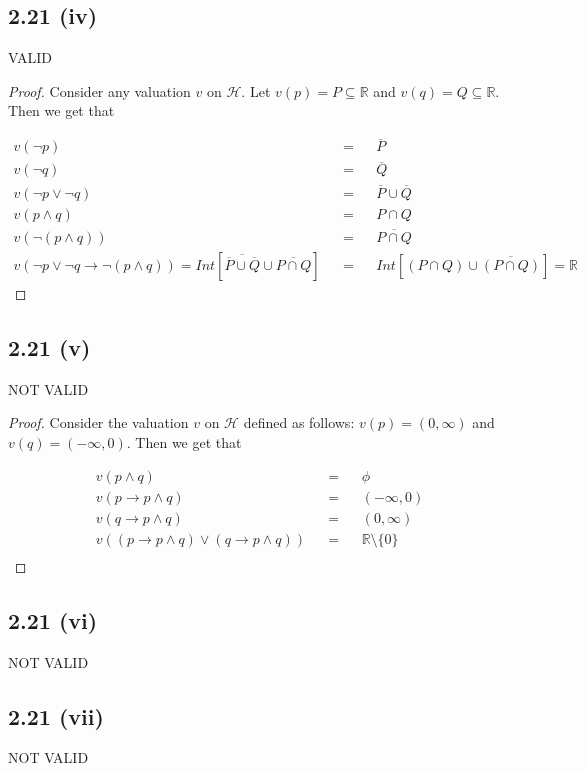 \documentclass[12pt]{article}
\begin{document}
\subsection*{2.21 (iv)} VALID

\begin{proof}
Consider any valuation $v$ on $\mathcal{H}$. Let $v(p) = P \subseteq \mathbb{R}$ and $v(q) = Q \subseteq \mathbb{R}$. Then we get that

\begin{align*}
    v(\neg p) && = && \overline{P} \\
    v(\neg q) && = && \overline{Q} \\
    v(\neg p \vee \neg q) && = && \overline{P} \cup \overline{Q} \\
    v(p \wedge q) && = && P \cap Q \\
    v(\neg (p \wedge q)) && = && \overline{P \cap Q} \\
    v(\neg p \vee \neg q \rightarrow \neg (p \wedge q)) = Int[\overline{\overline{P} \cup \overline{Q}} \cup \overline{P \cap Q}] && = && Int[(P \cap Q) \cup \overline{(P \cap Q)}] = \mathbb{R}
\end{align*}
\end{proof}

\subsection*{2.21 (v)} NOT VALID
\begin{proof}
Consider the valuation $v$ on $\mathcal{H}$ defined as follows: $v(p) = (0, \infty)$ and $v(q) = (-\infty, 0)$. Then we get that

\begin{align*}
    v(p \wedge q) &&=&& \phi \\
    v(p \rightarrow p \wedge q) && = && (-\infty, 0) \\
    v(q \rightarrow p \wedge q) && = && (0, \infty) \\
    v((p \rightarrow p \wedge q) \vee (q \rightarrow p \wedge q)) && = && \mathbb{R} \setminus \{0\} \\
\end{align*}
\end{proof}

\subsection*{2.21 (vi)} NOT VALID

\subsection*{2.21 (vii)} NOT VALID
\end{document}
